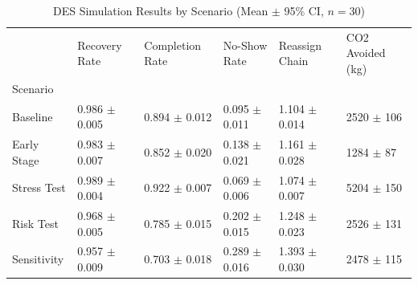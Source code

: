\begin{table}
\caption{DES Simulation Results by Scenario (Mean $\pm$ 95\% CI, $n=30$)}
\label{tab:des_results}
\begin{tabular}{llllll}
\toprule
 & Recovery Rate & Completion Rate & No-Show Rate & Reassign Chain & CO2 Avoided (kg) \\
Scenario &  &  &  &  &  \\
\midrule
Baseline & 0.986 $\pm$ 0.005 & 0.894 $\pm$ 0.012 & 0.095 $\pm$ 0.011 & 1.104 $\pm$ 0.014 & 2520 $\pm$ 106 \\
Early Stage & 0.983 $\pm$ 0.007 & 0.852 $\pm$ 0.020 & 0.138 $\pm$ 0.021 & 1.161 $\pm$ 0.028 & 1284 $\pm$ 87 \\
Stress Test & 0.989 $\pm$ 0.004 & 0.922 $\pm$ 0.007 & 0.069 $\pm$ 0.006 & 1.074 $\pm$ 0.007 & 5204 $\pm$ 150 \\
Risk Test & 0.968 $\pm$ 0.005 & 0.785 $\pm$ 0.015 & 0.202 $\pm$ 0.015 & 1.248 $\pm$ 0.023 & 2526 $\pm$ 131 \\
Sensitivity & 0.957 $\pm$ 0.009 & 0.703 $\pm$ 0.018 & 0.289 $\pm$ 0.016 & 1.393 $\pm$ 0.030 & 2478 $\pm$ 115 \\
\bottomrule
\end{tabular}
\end{table}
